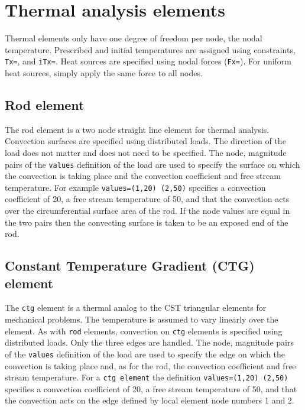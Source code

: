\section{Thermal analysis elements}

Thermal elements only have one degree of freedom per node,
the nodal temperature.  Prescribed and initial temperatures
are assigned using constraints, {\tt Tx=}, and {\tt iTx=}.
Heat sources are specified using nodal forces ({\tt Fx=}).
For uniform heat sources, simply apply the same force to
all nodes.

\subsection{Rod element}

The rod element is a two node straight line element for thermal
analysis.   Convection surfaces are specified using distributed
loads.  The direction of the load does not matter
and does not need to be specified.  The node, magnitude pairs of
the {\tt values} definition of the load are used to specify the
surface on which the convection is taking place and the convection
coefficient and free stream temperature.  For example
{\tt values=(1,20) (2,50)} specifies a convection coefficient of
20, a free stream temperature of 50, and that the convection acts
over the circumferential surface area of the rod.  If the 
node values are equal in the two pairs then the convecting surface
is taken to be an exposed end of the rod.

\subsection{Constant Temperature Gradient (CTG) element}

The {\tt ctg} element is a thermal analog to the CST triangular
elements for mechanical problems.  
The temperature is assumed to vary linearly over the element.  
As with {\tt rod} elements, convection on {\tt ctg} elements is specified
using distributed loads.  Only the three edges are handled.
The node, magnitude pairs of the {\tt values} definition of the load are 
used to specify the edge on which the convection is taking place and,
as for the rod,  the convection coefficient and free stream temperature.  
For a {\tt ctg element} the definition
{\tt values=(1,20) (2,50)} specifies a convection coefficient of
20, a free stream temperature of 50, and that the convection acts
on the edge defined by local element node numbers 1 and 2.  
